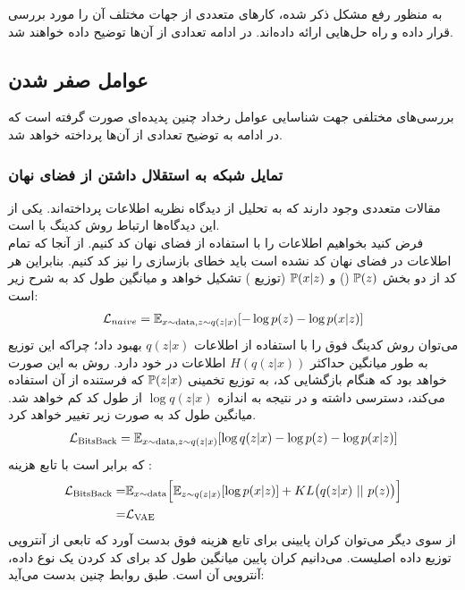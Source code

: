 به منظور رفع مشکل ذکر شده، کارهای متعددی از جهات مختلف آن را مورد بررسی قرار داده و راه حل‌هایی ارائه داده‌اند. در ادامه تعدادی از آن‌ها توضیح داده خواهند شد.
\subsection{عوامل صفر شدن }
بررسی‌های مختلفی جهت شناسایی عوامل رخداد چنین پدیده‌ای صورت گرفته است که در ادامه به توضیح تعدادی از آن‌ها پرداخته خواهد شد.
\subsubsection{تمایل شبکه \decoder{}
	به استقلال داشتن از فضای نهان}
مقالات متعددی وجود دارند که به تحلیل \vae{} از دیدگاه نظریه اطلاعات پرداخته‌اند. یکی از این دیدگاه‌ها ارتباط روش کدینگ \bitsback{} با \vae{} است.\\
فرض کنید بخواهیم اطلاعات را با استفاده از فضای نهان \vae{} کد کنیم. از آنجا که تمام اطلاعات در فضای نهان کد نشده است باید خطای بازسازی را نیز کد کنیم. بنابراین هر کد از دو بخش
$\mathbb P(z)$
(\priordist{})
و $\mathbb P(x|z)$
(توزیع \decoder{})
تشکیل خواهد و میانگین طول کد به شرح زیر است:
\begin{gather}
	\mathcal{L}_{naive} = \mathbb E_{x \sim \text{data}, z \sim q(z|x)} [-\log p(z) - \log p(x|z)]
\end{gather}
می‌توان روش کدینگ فوق را با استفاده از اطلاعات $q(z|x)$ بهبود داد؛ چراکه این توزیع به طور میانگین حداکثر $H(q(z|x))$   اطلاعات در خود دارد. روش به این صورت خواهد بود که \decoder{} هنگام بازگشایی کد، به توزیع تخمینی $\mathbb P(z|x)$ که فرستنده از آن استفاده می‌کند، دسترسی داشته و در نتیجه به اندازه $\log q(z|x)$ از طول کد کم خواهد شد. میانگین طول کد به صورت زیر تغییر خواهد کرد.
\begin{gather}
	\mathcal{L}_{\text{BitsBack}} = \mathbb E_{x \sim \text{data}, z \sim q(z|x)} [\log q(z|x) -\log p(z) - \log p(x|z)]
\end{gather}
که برابر است با تابع هزینه \vae{}:
\begin{gather}
	\begin{align}
		\mathcal{L}_{\text{BitsBack}} = & \mathbb E_{x \sim \text{data}} \Big[\mathbb E_{z \sim q(z|x)} [\log p(x|z)] + KL\big(q(z|x) ~||~ p(z)\big)\Big] \nonumber
		\\
		=                               & \mathcal{L}_{\text{VAE}}
	\end{align}
\end{gather}
از سوی دیگر می‌توان کران پایینی برای تابع هزینه فوق بدست آورد که تابعی از آنتروپی توزیع داده اصلیست. می‌دانیم کران پایین میانگین طول کد برای کد کردن یک نوع داده، آنتروپی آن است. طبق روابط چنین بدست می‌آید:
